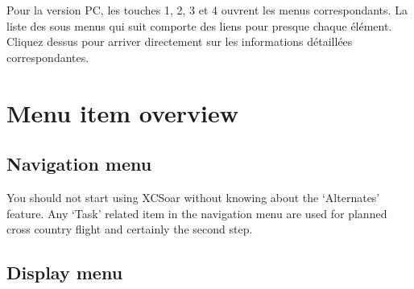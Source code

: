 Pour la version PC, les touches 1, 2, 3 et 4 ouvrent les menus correspondants. La liste des sous menus qui suit comporte des liens pour presque chaque élément. Cliquez dessus pour arriver directement sur les informations détaillées correspondantes.

\section{Menu item overview}

\subsection*{Navigation menu}
\noindent{}

You should not start using XCSoar without knowing about the `Alternates' feature. 
Any `Task' related item in the navigation menu are used for planned cross 
country flight and certainly the second step.

\subsection*{Display menu}
\noindent{}


